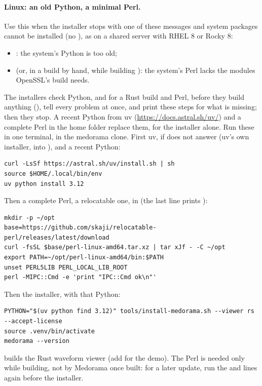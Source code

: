\paragraph{Linux: an old Python, a minimal Perl.} Use this when the installer stops with one of
these messages and system packages cannot be installed (no ), as on a shared server
with RHEL 8 or Rocky 8:
\begin{itemize}
\item {}: the system's Python is too old;
\item {} (or, in a build by hand,
   while building ): the system's Perl
  lacks the modules OpenSSL's build needs.
\end{itemize}
The installers check Python, and for a Rust build  and Perl, before they build anything
(), tell every problem at once, and print these steps for what is
missing; then they stop.
A recent Python from uv (\url{https://docs.astral.sh/uv/}) and a complete Perl in the home
folder replace them, for the installer alone. Run these in one terminal, in the medorama
clone. First uv, if  does not answer (uv's own installer, into
), and a recent Python:
\begin{lstlisting}[style=shell]
curl -LsSf https://astral.sh/uv/install.sh | sh
source $HOME/.local/bin/env
uv python install 3.12
\end{lstlisting}
Then a complete Perl, a relocatable one, in  (the last line prints
):
\begin{lstlisting}[style=shell]
mkdir -p ~/opt
base=https://github.com/skaji/relocatable-perl/releases/latest/download
curl -fsSL $base/perl-linux-amd64.tar.xz | tar xJf - -C ~/opt
export PATH=~/opt/perl-linux-amd64/bin:$PATH
unset PERL5LIB PERL_LOCAL_LIB_ROOT
perl -MIPC::Cmd -e 'print "IPC::Cmd ok\n"'
\end{lstlisting}
Then the installer, with that Python:
\begin{lstlisting}[style=shell]
PYTHON="$(uv python find 3.12)" tools/install-medorama.sh --viewer rs --accept-license
source .venv/bin/activate
medorama --version
\end{lstlisting}
 builds the Rust waveform viewer (add  for the demo). The Perl is needed only while building, not by Medorama once built: for a later
update, run the  and  lines again before the installer.

